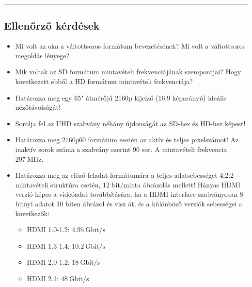 

\vspace{2cm}
\noindent\rule{12cm}{0.4pt}

\subsection*{Ellenőrző kérdések}

\begin{itemize}
\item Mi volt az oka a váltottsoros formátum bevezetésének?
Mi volt a váltottsoros megoldás lényege?
\item Mik voltak az SD formátum mintavételi frekvenciájának szempontjai?
Hogy következett ebből a HD formátum mintavételi frekvenciája?
\item Határozza meg egy 65" átmérőjű 2160p kijelző (16:9 képarányú) ideális nézőtávolságát!
\item Sorolja fel az UHD szabvány néhány újdonságát az SD-hez és HD-hez képest!
\item Határozza meg $2160p60$ formátum esetén az aktív és teljes pixelszámot! 
Az inaktív sorok száma a szabvány szerint 90 sor.
A mintavételi frekvencia $297~\mathrm{MHz}$.
\item Határozza meg az előző feladat formátumára a teljes adatsebességet 4:2:2 mintavételi struktúra esetén, 12 bit/minta ábrázolás mellett!
Hányas HDMI verzió képes a videóadat továbbítására, ha a HDMI interface szabványosan 8 bitnyi adatot 10 biten ábrázol és visz át, és a különböző verziók sebességei a következők:
\begin{itemize}
\item HDMI 1.0-1.2: $4.95~\mathrm{Gbit/s}$
\item HDMI 1.3-1.4: $10.2~\mathrm{Gbit/s}$
\item HDMI 2.0-1.2: $18~\mathrm{Gbit/s}$
\item HDMI 2.1: $48~\mathrm{Gbit/s}$
\end{itemize}
\end{itemize}